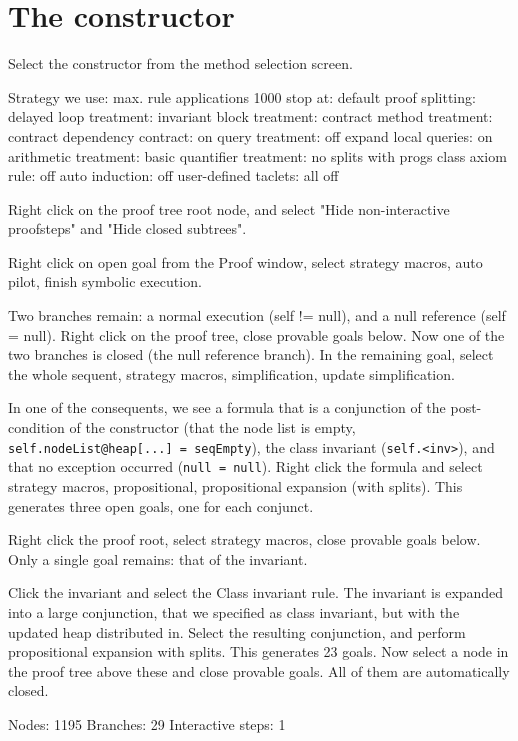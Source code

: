 \section{The constructor}\label{sec:constructor}

Select the constructor from the method selection screen.

Strategy we use:
max. rule applications 1000
stop at: default
proof splitting: delayed
loop treatment: invariant
block treatment: contract
method treatment: contract
dependency contract: on
query treatment: off
expand local queries: on
arithmetic treatment: basic
quantifier treatment: no splits with progs
class axiom rule: off
auto induction: off
user-defined taclets: all off

Right click on the proof tree root node, and select "Hide non-interactive proofsteps" and "Hide closed subtrees".

Right click on open goal from the Proof window, select strategy macros, auto pilot, finish symbolic execution.

Two branches remain: a normal execution (self != null), and a null reference (self = null). Right click on the proof tree, close provable goals below. Now one of the two branches is closed (the null reference branch). In the remaining goal, select the whole sequent, strategy macros, simplification, update simplification.

In one of the consequents, we see a formula that is a conjunction of the post-condition of the constructor (that the node list is empty, \texttt{self.nodeList@heap[...] = seqEmpty}), the class invariant (\texttt{self.<inv>}), and that no exception occurred (\texttt{null = null}). Right click the formula and select strategy macros, propositional, propositional expansion (with splits). This generates three open goals, one for each conjunct.

Right click the proof root, select strategy macros, close provable goals below. Only a single goal remains: that of the invariant.

Click the invariant and select the Class invariant rule. The invariant is expanded into a large conjunction, that we specified as class invariant, but with the updated heap distributed in. Select the resulting conjunction, and perform propositional expansion with splits. This generates 23 goals. Now select a node in the proof tree above these and close provable goals. All of them are automatically closed.

Nodes: 1195
Branches: 29
Interactive steps: 1

